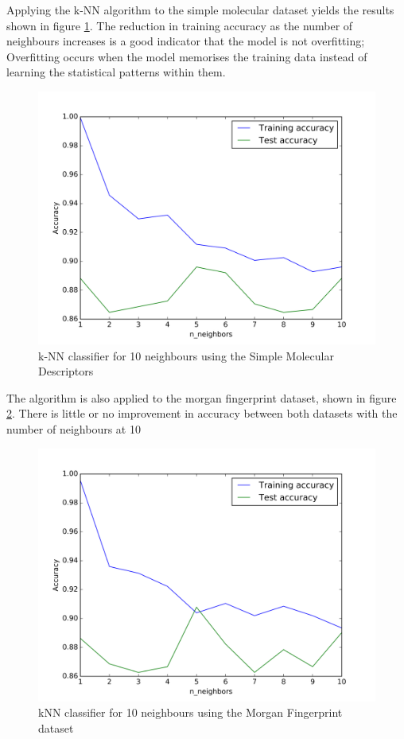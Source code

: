 \documentclass[a4paper,12pt]{report}
\begin{document}
		Applying the k-NN algorithm to the simple molecular dataset yields the results shown in figure \ref{fig:knn_smd}. The reduction in training accuracy as the number of neighbours increases is a good indicator that the model is not overfitting; Overfitting occurs when the model memorises the training data instead of learning the statistical patterns within them.
		\begin{figure}[H]
			\centering
			\includegraphics[width=\textwidth,scale=1,totalheight=0.5\textheight]{images/knn_molecular_descriptors}
			\caption{k-NN classifier for 10 neighbours using the Simple Molecular Descriptors}
			\label{fig:knn_smd}
		\end{figure}
		The algorithm is also applied to the morgan fingerprint dataset, shown in figure \ref{fig:knn_mfps}. There is little or no improvement in accuracy between both datasets with the number of neighbours at 10
		\begin{figure}[H]
			\centering
			\includegraphics[width=\textwidth,scale=1,totalheight=0.5\textheight]{images/knn_morgan_dice_fingerprint}
			\caption{kNN classifier for 10 neighbours using the Morgan Fingerprint dataset}
			\label{fig:knn_mfps}
		\end{figure}
		
\end{document}

